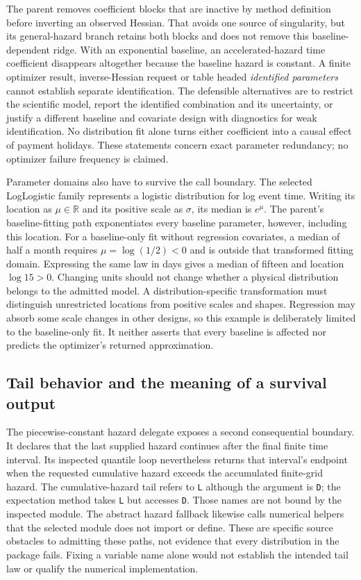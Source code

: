 The parent removes coefficient blocks that are inactive by method definition
before inverting an observed Hessian. That avoids one source of singularity,
but its general-hazard branch retains both blocks and does not remove this
baseline-dependent ridge. With an exponential baseline, an accelerated-hazard
time coefficient disappears altogether because the baseline hazard is
constant. A finite optimizer result, inverse-Hessian request or table headed
\emph{identified parameters} cannot establish separate identification. The
defensible alternatives are to restrict the scientific model, report the
identified combination and its uncertainty, or justify a different baseline
and covariate design with diagnostics for weak identification. No distribution
fit alone turns either coefficient into a causal effect of payment holidays.
These statements concern exact parameter redundancy; no optimizer failure
frequency is claimed. \citep{rel22survcaller,rel22survwitness}

Parameter domains also have to survive the call boundary. The selected
LogLogistic family represents a logistic distribution for log event time.
Writing its location as $\mu\in\mathbb R$ and its positive scale as $\sigma$,
its median is $e^\mu$. The parent's baseline-fitting path exponentiates every
baseline parameter, however, including this location. For a baseline-only fit
without regression covariates, a median of half a month requires
$\mu=\log(1/2)<0$ and is outside that transformed fitting domain. Expressing
the same law in days gives a median of fifteen and location $\log 15>0$.
Changing units should not change whether a physical distribution belongs to
the admitted model. A distribution-specific transformation must distinguish
unrestricted locations from positive scales and shapes. Regression may
absorb some scale changes in other designs, so this example is deliberately
limited to the baseline-only fit. It neither asserts that every baseline is
affected nor predicts the optimizer's returned approximation.
\citep{rel22survdist,rel22survcaller,rel22survwitness}

\subsection{Tail behavior and the meaning of a survival output}
\label{rel22:survival-tail}

The piecewise-constant hazard delegate exposes a second consequential
boundary. It declares that the last supplied hazard continues after the final
finite time interval. Its inspected quantile loop nevertheless returns that
interval's endpoint when the requested cumulative hazard exceeds the
accumulated finite-grid hazard. The cumulative-hazard tail refers to
\texttt{L} although the argument is \texttt{D}; the expectation method takes
\texttt{L} but accesses \texttt{D}. Those names are not bound by the inspected
module. The abstract hazard fallback likewise calls numerical helpers that
the selected module does not import or define. These are specific source
obstacles to admitting these paths, not evidence that every distribution in
the package fails. Fixing a variable name alone would not establish the
intended tail law or qualify the numerical implementation.
\citep{rel22survdist}

